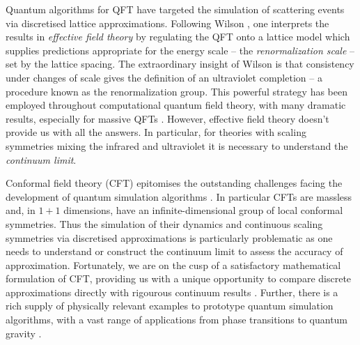\documentclass[12pt]{article}
\newcommand{\1}{\mathds{1}}
\begin{document}
Quantum algorithms for QFT have targeted the simulation of scattering events via discretised lattice approximations. Following Wilson \cite{wilsonRenormalizationGroupCritical1975,wilsonRenormalizationGroupCritical1983,wilsonRenormalizationGroupEpsilon1974}, one interprets the results in \emph{effective field theory} by regulating the QFT onto a lattice model which supplies predictions appropriate for the energy scale -- the \emph{renormalization scale} -- set by the lattice spacing. The extraordinary insight of Wilson is that consistency under changes of scale gives the definition of an ultraviolet completion -- a procedure known as the renormalization group. This powerful strategy has been employed throughout computational quantum field theory, with many dramatic results, especially for massive QFTs \cite{durrInitioDeterminationLight2008,creutzQuarksGluonsLattices1985}. However, effective field theory doesn't provide us with all the answers. In particular, for theories with scaling symmetries mixing the infrared and ultraviolet it is necessary to understand the \emph{continuum limit}.  

Conformal field theory (CFT) \cite{belavinInfiniteConformalSymmetry1984,francescoConformalFieldTheory1997} epitomises the outstanding challenges facing the development of quantum simulation algorithms \cite{preskillSimulatingQuantumField2018,ziniConformalFieldTheories2018}. In particular CFTs are massless and, in $1+1$ dimensions, have an infinite-dimensional group of local conformal symmetries. Thus the simulation of their dynamics and continuous scaling symmetries via discretised approximations is particularly problematic as one needs to understand or construct the continuum limit to assess the accuracy of approximation. Fortunately, we are on the cusp of a satisfactory mathematical formulation of CFT, providing us with a unique opportunity to compare discrete approximations directly with rigourous continuum results \cite{fredenhagenSuperselectionSectorsBraid1992,borcherdsVertexAlgebrasKacMoody1986,lepowskyIntroductionVertexOperator2004,segalDefinitionConformalField2004,ziniConformalFieldTheories2018,stottmeisterOperatoralgebraicRenormalizationWavelets2020,honglerConformalFieldTheory2019}. Further, there is a rich supply of physically relevant examples to prototype quantum simulation algorithms, with a vast range of applications from phase transitions to quantum gravity \cite{cardyScalingRenormalizationStatistical1996,maldacenaLargeLimitSuperconformal1998}. 
\end{document}

